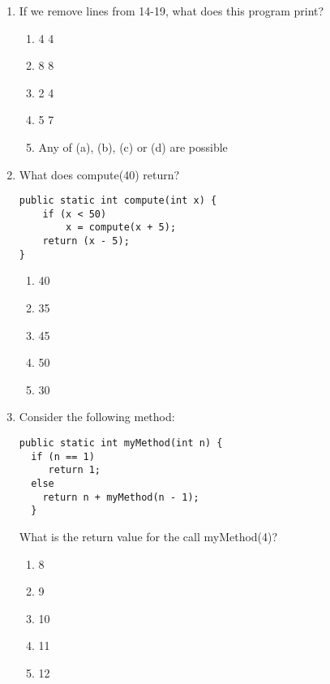 \documentclass[CS180-S16-FinalExam.tex]{subfiles}
\begin{document}
\begin{enumerate}
\item If we remove lines from 14-19, what does this program print?
\begin{enumerate}
\item 4 4
\item 8 8 
\item 2 4
\item 5 7
\item Any of (a), (b), (c) or (d) are possible \ifdraft \Ans \fi 
\end{enumerate}
\clearpage
\item What does compute(40) return?
\begin{lstlisting}
public static int compute(int x) {
	if (x < 50)
    	x = compute(x + 5);
    return (x - 5);
}
\end{lstlisting}
\begin{enumerate}
\item 40
\item 35  \ifdraft \Ans \fi 
\item 45
\item 50
\item 30
\end{enumerate}

\item Consider the following method:
\begin{lstlisting}
public static int myMethod(int n) {
  if (n == 1)
     return 1;
  else
    return n + myMethod(n - 1);
  }
\end{lstlisting}
What is the return value for the call myMethod(4)?
\begin{enumerate}
\item 8
\item 9
\item 10 \ifdraft \Ans \fi
\item 11
\item 12
\end{enumerate}


\end{enumerate}
\end{document}
